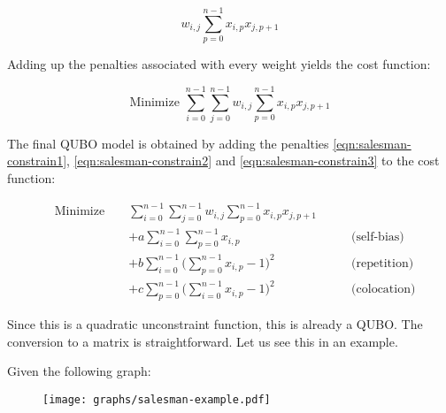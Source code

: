 $$ w_{i,j} \sum_{p=0}^{n-1} x_{i,p}x_{j,p+1} $$

Adding up the penalties associated with every weight yields the cost function:

$$ \text{Minimize } \sum_{i=0}^{n-1} \sum_{j=0}^{n-1} w_{i,j}\sum_{p=0}^{n-1} x_{i,p}x_{j,p+1} $$

The final QUBO model is obtained by adding the penalties \ref{eqn:salesman-constrain1}, \ref{eqn:salesman-constrain2} and \ref{eqn:salesman-constrain3} to the cost function:

\begin{equation}
	\begin{alignedat}{3}
		& \text{Minimize }	&& \sum_{i=0}^{n-1} \sum_{j=0}^{n-1} w_{i,j}\sum_{p=0}^{n-1} x_{i,p}x_{j,p+1} & \\
		& && + a \sum_{i=0}^{n-1} \sum_{p=0}^{n-1} x_{i,p} & \qquad \text{(self-bias)} \\
		& && + b \sum_{i=0}^{n-1} \Big( \sum_{p=0}^{n-1} x_{i,p} - 1 \Big)^2 & \qquad \text{(repetition)} \\
		& && + c \sum_{p=0}^{n-1} \Big( \sum_{i=0}^{n-1} x_{i,p} - 1 \Big)^2 & \qquad \text{(colocation)}
	\end{alignedat}
	\label{eqn:salesman-cost-funct}
\end{equation}


Since this is a quadratic unconstraint function, this is already a QUBO. The conversion to a matrix is straightforward. Let us see this in an example.


\label{sec:salesman-example}


Given the following graph:

\begin{figure}[H]
	\texttt{[image: graphs/salesman-example.pdf]}
	\centering
	\label{fig:salesman-graph} %
\end{figure}

